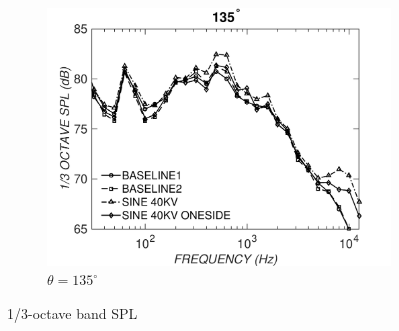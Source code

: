 \begin{figure}
\begin{center}
\hspace*{\fill} %

\begin{subfigure}{0.5\textwidth}
\includegraphics[width=\linewidth]{figures/octave135}
\caption{$\theta=135^\circ$}
\label{fig:octave135}
\end{subfigure}

\caption{1/3-octave band SPL}
\label{fig:octave}
\end{center}
\end{figure}

